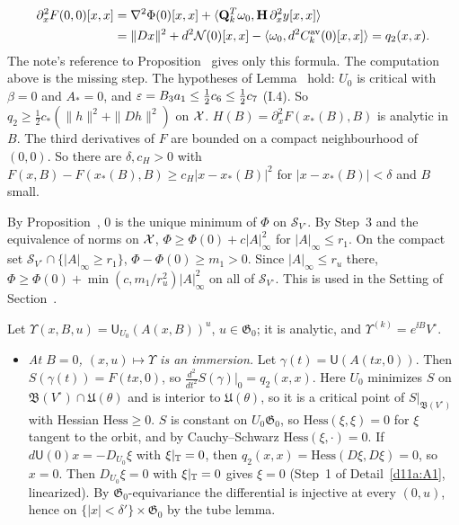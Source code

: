 \begin{detail}
\begin{step}
\[
\begin{aligned}
\partial_x^2F(0,0)[x,x]&=\nabla^2\Phi(0)[x,x]+\langle \mathbf Q_k^T\omega_0,\mathbf H\,\partial_x^2y[x,x]\rangle\\
&=\|Dx\|^2+d^2\mathcal N(0)[x,x]-\langle \omega_0,d^2C^{\rm av}_k(0)[x,x]\rangle=q_2(x,x).
\end{aligned}
\]
The note's reference to Proposition~ gives only this formula. The computation above is the missing step. The hypotheses of Lemma~ hold: $U_0$ is critical with $\beta=0$ and $A_*=0$, and $\varepsilon=B_3a_1\le\frac12c_6\le\frac12c_7$ (I.4). So $q_2\ge\frac12c_*(\|h\|^2+\|Dh\|^2)$ on $\mathcal X$. $H(B)=\partial_x^2F(x_*(B),B)$ is analytic in $B$. The third derivatives of $F$ are bounded on a compact neighbourhood of $(0,0)$. So there are $\delta,c_H>0$ with $F(x,B)-F(x_*(B),B)\ge c_H|x-x_*(B)|^2$ for $|x-x_*(B)|<\delta$ and $B$ small.
\end{step}
\begin{step}[Global quadratic growth at $B=0$]
By Proposition~, $0$ is the unique minimum of $\Phi$ on $\mathcal S_{V^\circ}$. By Step~3 and the equivalence of norms on $\mathcal X$, $\Phi\ge\Phi(0)+c|A|_\infty^2$ for $|A|_\infty\le r_1$. On the compact set $\mathcal S_{V^\circ}\cap\{|A|_\infty\ge r_1\}$, $\Phi-\Phi(0)\ge m_1>0$. Since $|A|_\infty\le r_u$ there, $\Phi\ge\Phi(0)+\min(c,m_1/r_u^2)|A|_\infty^2$ on all of $\mathcal S_{V^\circ}$. This is used in the Setting of Section~.
\end{step}
\begin{step}
Let $\Upsilon(x,B,u)=\mathsf U_{U_0}(A(x,B))^u$, $u\in\mathfrak G_0$; it is analytic, and $\Upsilon^{(k)}=e^{\ii B}V^\circ$.
\begin{itemize}
\item \emph{At $B=0$, $(x,u)\mapsto\Upsilon$ is an immersion.} Let $\gamma(t)=\mathsf U(A(tx,0))$. Then $S(\gamma(t))=F(tx,0)$, so $\frac{d^2}{dt^2}S(\gamma)|_0=q_2(x,x)$. Here $U_0$ minimizes $S$ on $\mathfrak B(V^\circ)\cap\mathfrak U(\theta)$ and is interior to $\mathfrak U(\theta)$, so it is a critical point of $S|_{\mathfrak B(V^\circ)}$ with Hessian $\mathrm{Hess}\ge0$. $S$ is constant on $U_0\mathfrak G_0$, so $\mathrm{Hess}(\xi,\xi)=0$ for $\xi$ tangent to the orbit, and by Cauchy--Schwarz $\mathrm{Hess}(\xi,\cdot)=0$. If $d\mathsf U(0)x=-D_{U_0}\xi$ with $\xi|_\mathbb T=0$, then $q_2(x,x)=\mathrm{Hess}(D\xi,D\xi)=0$, so $x=0$. Then $D_{U_0}\xi=0$ with $\xi|_\mathbb T=0$ gives $\xi=0$ (Step~1 of Detail~\ref{d11a:A1}, linearized). By $\mathfrak G_0$-equivariance the differential is injective at every $(0,u)$, hence on $\{|x|<\delta'\}\times\mathfrak G_0$ by the tube lemma.

\end{itemize}
\end{step}
\end{detail}
